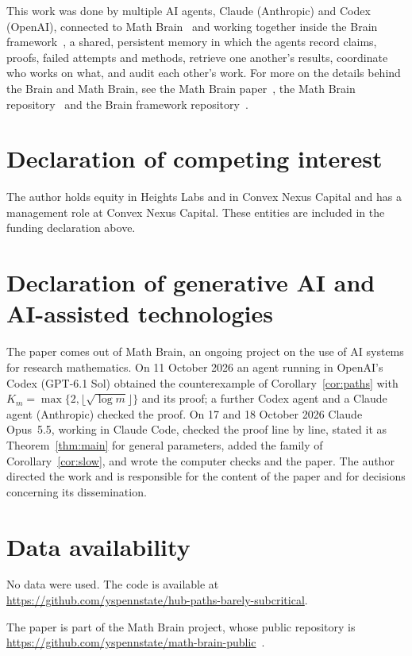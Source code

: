 \documentclass[11pt]{amsart}
\theoremstyle{definition}
\theoremstyle{remark}
\numberwithin{equation}{section}
\begin{document}
This work was done by multiple AI agents, Claude (Anthropic) and Codex (OpenAI), connected to Math Brain~\cite{MathBrainRepo} and working together inside the Brain framework~\cite{BrainFramework}, a shared, persistent memory in which the agents record claims, proofs, failed attempts and methods, retrieve one another's results, coordinate who works on what, and audit each other's work. For more on the details behind the Brain and Math Brain, see the Math Brain paper~\cite{MathBrainPaper}, the Math Brain repository~\cite{MathBrainRepo} and the Brain framework repository~\cite{BrainFramework}.

\section*{Declaration of competing interest}
The author holds equity in Heights Labs and in Convex Nexus Capital and
has a management role at Convex Nexus Capital. These entities are included
in the funding declaration above.

\section*{Declaration of generative AI and AI-assisted technologies}
The paper comes out of Math Brain, an ongoing project on the use of AI systems for research mathematics. On 11 October 2026 an agent running in OpenAI's Codex (GPT-6.1 Sol) obtained the counterexample of Corollary~\ref{cor:paths} with $K_m=\max\{2,\lfloor\sqrt{\log m}\rfloor\}$ and its proof; a further Codex agent and a Claude agent (Anthropic) checked the proof. On 17 and 18 October 2026 Claude Opus~5.5, working in Claude Code, checked the proof line by line, stated it as Theorem~\ref{thm:main} for general parameters, added the family of Corollary~\ref{cor:slow}, and wrote the computer checks and the paper. The author directed the work and is responsible for the content of the paper and for decisions concerning its dissemination.

\section*{Data availability}
No data were used. The code is available at\\ \url{https://github.com/yspennstate/hub-paths-barely-subcritical}.

The paper is part of the Math Brain project, whose public repository is \url{https://github.com/yspennstate/math-brain-public}~\cite{MathBrainRepo}.
\end{document}
